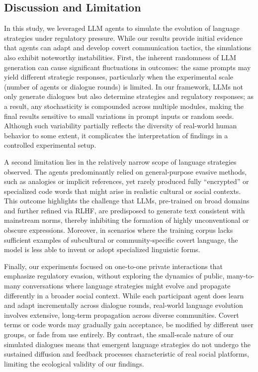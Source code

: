 \subsection{Discussion and Limitation}
In this study, we leveraged LLM agents to simulate the evolution of language strategies under regulatory pressure. While our results provide initial evidence that agents can adapt and develop covert communication tactics, the simulations also exhibit noteworthy instabilities. First, the inherent randomness of LLM generation can cause significant fluctuations in outcomes: the same prompts may yield different strategic responses, particularly when the experimental scale (number of agents or dialogue rounds) is limited. In our framework, LLMs not only generate dialogues but also determine strategies and regulatory responses; as a result, any stochasticity is compounded across multiple modules, making the final results sensitive to small variations in prompt inputs or random seeds. Although such variability partially reflects the diversity of real-world human behavior to some extent, it complicates the interpretation of findings in a controlled experimental setup.

A second limitation lies in the relatively narrow scope of language strategies observed. The agents predominantly relied on general-purpose evasive methods, such as analogies or implicit references, yet rarely produced fully “encrypted” or specialized code words that might arise in realistic cultural or social contexts. This outcome highlights the challenge that LLMs, pre-trained on broad domains and further refined via RLHF, are predisposed to generate text consistent with mainstream norms, thereby inhibiting the formation of highly unconventional or obscure expressions. Moreover, in scenarios where the training corpus lacks sufficient examples of subcultural or community-specific covert language, the model is less able to invent or adopt specialized linguistic forms. 

Finally, our experiments focused on one-to-one private interactions that emphasize regulatory evasion, without exploring the dynamics of public, many-to-many conversations where language strategies might evolve and propagate differently in a broader social context. While each participant agent does learn and adapt incrementally across dialogue rounds, real-world language evolution involves extensive, long-term propagation across diverse communities. Covert terms or code words may gradually gain acceptance, be modified by different user groups, or fade from use entirely. By contrast, the small-scale nature of our simulated dialogues means that emergent language strategies do not undergo the sustained diffusion and feedback processes characteristic of real social platforms, limiting the ecological validity of our findings.




